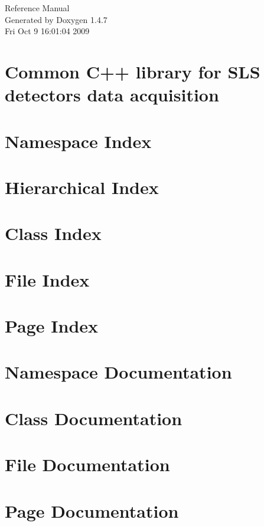 \documentclass[a4paper]{book}
\begin{document}
\begin{titlepage}
\vspace*{7cm}
\begin{center}
{\Large Reference Manual}\\
\vspace*{1cm}
{\large Generated by Doxygen 1.4.7}\\
\vspace*{0.5cm}
{\small Fri Oct 9 16:01:04 2009}\\
\end{center}
\end{titlepage}
\clearemptydoublepage
{}
\tableofcontents
\clearemptydoublepage
{}
\chapter{Common C++ library for SLS detectors data acquisition }
\label{index}
\chapter{Namespace Index}

\chapter{Hierarchical Index}

\chapter{Class Index}

\chapter{File Index}

\chapter{Page Index}

\chapter{Namespace Documentation}

\chapter{Class Documentation}











\chapter{File Documentation}









\chapter{Page Documentation}

\printindex
\end{document}
